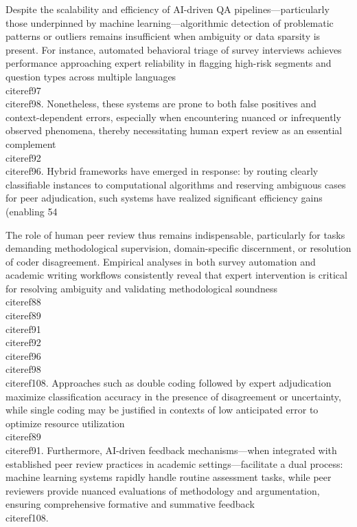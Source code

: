 \documentclass[11pt]{article}
\begin{document}
Despite the scalability and efficiency of AI-driven QA pipelines—particularly those underpinned by machine learning—algorithmic detection of problematic patterns or outliers remains insufficient when ambiguity or data sparsity is present. For instance, automated behavioral triage of survey interviews achieves performance approaching expert reliability in flagging high-risk segments and question types across multiple languages \\cite{ref97}\\cite{ref98}. Nonetheless, these systems are prone to both false positives and context-dependent errors, especially when encountering nuanced or infrequently observed phenomena, thereby necessitating human expert review as an essential complement \\cite{ref92}\\cite{ref96}. Hybrid frameworks have emerged in response: by routing clearly classifiable instances to computational algorithms and reserving ambiguous cases for peer adjudication, such systems have realized significant efficiency gains (enabling 54%

The role of human peer review thus remains indispensable, particularly for tasks demanding methodological supervision, domain-specific discernment, or resolution of coder disagreement. Empirical analyses in both survey automation and academic writing workflows consistently reveal that expert intervention is critical for resolving ambiguity and validating methodological soundness \\cite{ref88}\\cite{ref89}\\cite{ref91}\\cite{ref92}\\cite{ref96}\\cite{ref98}\\cite{ref108}. Approaches such as double coding followed by expert adjudication maximize classification accuracy in the presence of disagreement or uncertainty, while single coding may be justified in contexts of low anticipated error to optimize resource utilization \\cite{ref89}\\cite{ref91}. Furthermore, AI-driven feedback mechanisms—when integrated with established peer review practices in academic settings—facilitate a dual process: machine learning systems rapidly handle routine assessment tasks, while peer reviewers provide nuanced evaluations of methodology and argumentation, ensuring comprehensive formative and summative feedback \\cite{ref108}.
\end{document}
